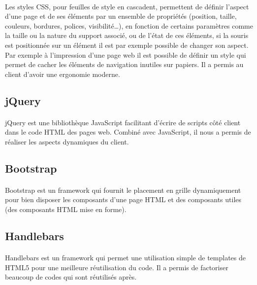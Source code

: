 \documentclass{report}
\begin{document}
\paragraph{}
Les styles CSS, pour feuilles de style en cascadent, permettent de définir l’aspect d'une page et de ses éléments par un 
ensemble de propriétés (position, taille, couleurs, bordures, polices, visibilité…), en fonction de certains paramètres 
comme la taille ou la nature du support associé, ou de l'état de ces éléments, si la souris est positionnée sur un élément 
il est par exemple possible de changer son aspect. Par exemple à l'impression d'une page web il est possible de définir 
un style qui permet de cacher les éléments de navigation inutiles sur papiers. Il a permis au client d'avoir une ergonomie
moderne.

\subsection*{jQuery}

\paragraph{}
jQuery est une bibliothèque JavaScript facilitant d'écrire de scripts côté client dans le code HTML des pages web. 
Combiné avec JavaScript, il nous a permis de réaliser les aspects dynamiques du client.

\subsection*{Bootstrap}

\paragraph{}
Bootstrap est un framework qui fournit le placement en grille dynamiquement pour bien disposer les composants d'une
page HTML et  des composants utiles (des composants HTML mise en forme).

\subsection*{Handlebars}

\paragraph{}
Handlebars est un framework qui permet une utilisation simple de templates de HTML5 pour une meilleure réutilisation 
du code. Il a permis de factoriser beaucoup de codes qui sont réutilisés après.
\end{document}
